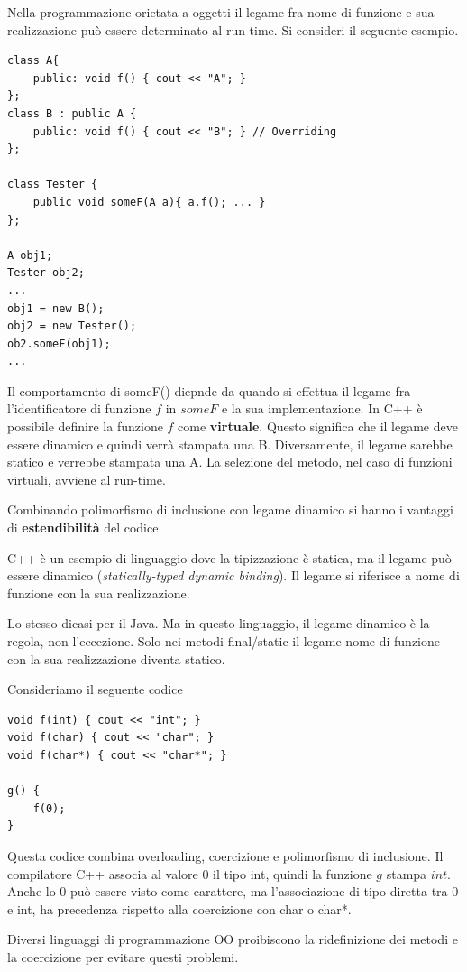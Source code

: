 \documentclass[12pt]{report}
\begin{document}
Nella programmazione orietata a oggetti il legame fra nome di funzione e sua realizzazione può essere determinato al run-time. Si consideri il seguente esempio.
\begin{lstlisting}[style=cppstyle]
class A{
	public: void f() { cout << "A"; }
};
class B : public A {
	public: void f() { cout << "B"; } // Overriding
};

class Tester {
	public void someF(A a){ a.f(); ... }
};

A obj1;
Tester obj2;
...
obj1 = new B();
obj2 = new Tester();
ob2.someF(obj1);
...
\end{lstlisting}
Il comportamento di someF() diepnde da quando si effettua il legame fra l'identificatore di funzione $f$ in $someF$ e la sua implementazione. In C++ è possibile definire la funzione $f$ come \textbf{virtuale}. Questo significa che il legame deve essere dinamico e quindi verrà stampata una B. Diversamente, il legame sarebbe statico e verrebbe stampata una A. La selezione del metodo, nel caso di funzioni virtuali, avviene al run-time.

Combinando polimorfismo di inclusione con legame dinamico si hanno i vantaggi di \textbf{estendibilità} del codice.

C++ è un esempio di linguaggio dove la tipizzazione è statica, ma il legame può essere dinamico (\textit{statically-typed dynamic binding}). Il legame si riferisce a nome di funzione con la sua realizzazione.

Lo stesso dicasi per il Java. Ma in questo linguaggio, il legame dinamico è la regola, non l'eccezione. Solo nei metodi final/static il legame nome di funzione con la sua realizzazione diventa statico.

Consideriamo il seguente codice
\begin{lstlisting}[style=cppstyle]
void f(int) { cout << "int"; }
void f(char) { cout << "char"; }
void f(char*) { cout << "char*"; }

g() {
	f(0);
}
\end{lstlisting}
Questa codice combina overloading, coercizione e polimorfismo di inclusione. Il compilatore C++ associa al valore 0 il tipo int, quindi la funzione $g$ stampa $int$. Anche lo 0 può essere visto come carattere, ma l'associazione di tipo diretta tra 0 e int, ha precedenza rispetto alla coercizione con char o char*.

Diversi linguaggi di programmazione OO proibiscono la ridefinizione dei metodi e la coercizione per evitare questi problemi.
\end{document}
